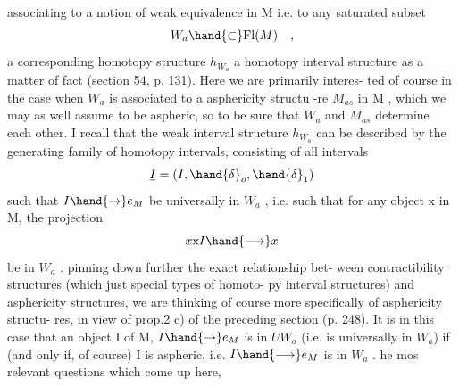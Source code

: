 
associating to a notion of weak equivalence in M i.e. to any saturated
subset 
\[ W_a \hand{\subset} \mathrm{Fl}(M) \quad , \]
a corresponding homotopy structure $h_{W_a}$ \hand{,}\deleted{\unsure{,}} a homotopy interval structure
as a matter of fact (section 54, p. 131).  Here we are primarily interes-%
ted of course in the case when $W_a$ is associated to a  asphericity structu
-re $M_{as}$ in M , which we may as well assume to be aspheric, so   to
be sure that $W_a$ and $M_{as}$ determine each other.  I recall that the weak
interval structure $h_{W_a}$  can be described by the generating family of
homotopy intervals, consisting of all intervals
\[ \underline{I} = (I,\hand{\delta}_o,\hand{\delta}_1) \]
such that $I \hand{\to} e_M$ be universally in $W_a$ , i.e. such that for any object
x in M, the projection
\[ x \text{x} I \hand{\longrightarrow} x \]
be in $W_a$ .    pinning down further the exact relationship bet-%
ween contractibility structures (which   just special types of homoto-%
py interval structures) and asphericity structures, we are thinking of
course  more specifically of \hand{\uline{\textcolor{black}{totally}}} \hand{\uline{\textcolor{black}{aspheric}}} asphericity structu-%
res, in view of prop.2 c) of the preceding section (p. 248).  It is   in this case that   an object I of M,
$I \hand{\to} e_M$ is in $UW_a$ (i.e. is universally in $W_a$)  if (and only if,
of course) I is aspheric, i.e. $I \hand{\longrightarrow} e_M$ is in $W_a$ .   he mos relevant questions which come up here, 
 

